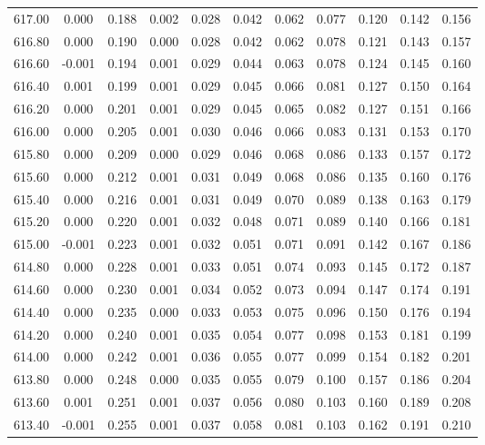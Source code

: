 \begin{longtable}{cccccccccc}
    617.00 &  0.000 &  0.188 &  0.002 &  0.028 &  0.042 &  0.062 &  0.077 &  0.120 &  0.142 &  0.156 \\
    616.80 &  0.000 &  0.190 &  0.000 &  0.028 &  0.042 &  0.062 &  0.078 &  0.121 &  0.143 &  0.157 \\
    616.60 & -0.001 &  0.194 &  0.001 &  0.029 &  0.044 &  0.063 &  0.078 &  0.124 &  0.145 &  0.160 \\
    616.40 &  0.001 &  0.199 &  0.001 &  0.029 &  0.045 &  0.066 &  0.081 &  0.127 &  0.150 &  0.164 \\
    616.20 &  0.000 &  0.201 &  0.001 &  0.029 &  0.045 &  0.065 &  0.082 &  0.127 &  0.151 &  0.166 \\
    616.00 &  0.000 &  0.205 &  0.001 &  0.030 &  0.046 &  0.066 &  0.083 &  0.131 &  0.153 &  0.170 \\
    615.80 &  0.000 &  0.209 &  0.000 &  0.029 &  0.046 &  0.068 &  0.086 &  0.133 &  0.157 &  0.172 \\
    615.60 &  0.000 &  0.212 &  0.001 &  0.031 &  0.049 &  0.068 &  0.086 &  0.135 &  0.160 &  0.176 \\
    615.40 &  0.000 &  0.216 &  0.001 &  0.031 &  0.049 &  0.070 &  0.089 &  0.138 &  0.163 &  0.179 \\
    615.20 &  0.000 &  0.220 &  0.001 &  0.032 &  0.048 &  0.071 &  0.089 &  0.140 &  0.166 &  0.181 \\
    615.00 & -0.001 &  0.223 &  0.001 &  0.032 &  0.051 &  0.071 &  0.091 &  0.142 &  0.167 &  0.186 \\
    614.80 &  0.000 &  0.228 &  0.001 &  0.033 &  0.051 &  0.074 &  0.093 &  0.145 &  0.172 &  0.187 \\
    614.60 &  0.000 &  0.230 &  0.001 &  0.034 &  0.052 &  0.073 &  0.094 &  0.147 &  0.174 &  0.191 \\
    614.40 &  0.000 &  0.235 &  0.000 &  0.033 &  0.053 &  0.075 &  0.096 &  0.150 &  0.176 &  0.194 \\
    614.20 &  0.000 &  0.240 &  0.001 &  0.035 &  0.054 &  0.077 &  0.098 &  0.153 &  0.181 &  0.199 \\
    614.00 &  0.000 &  0.242 &  0.001 &  0.036 &  0.055 &  0.077 &  0.099 &  0.154 &  0.182 &  0.201 \\
    613.80 &  0.000 &  0.248 &  0.000 &  0.035 &  0.055 &  0.079 &  0.100 &  0.157 &  0.186 &  0.204 \\
    613.60 &  0.001 &  0.251 &  0.001 &  0.037 &  0.056 &  0.080 &  0.103 &  0.160 &  0.189 &  0.208 \\
    613.40 & -0.001 &  0.255 &  0.001 &  0.037 &  0.058 &  0.081 &  0.103 &  0.162 &  0.191 &  0.210 \\

\end{longtable}
